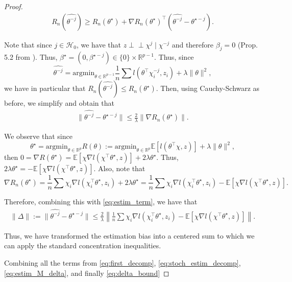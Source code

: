 \documentclass{article}
\theoremstyle{plain}
\theoremstyle{definition}
\theoremstyle{remark}
\newcommand{\indep}{\perp\!\!\!\perp}
\newcommand{\e}[1]{\mathbb{E}\left[#1\right]  } %
\begin{document}
\begin{proof}
\begin{align*}
    R_n(\widehat{\theta^{-j}})\geq R_n(\theta^\star)+\nabla R_n(\theta^\star)^\top (\widehat{\theta^{-j}}-\theta^{\star-j}).
\end{align*}

Note that since $j\in \mathcal{H}_0$, we have that $z\indep \chi^{j}\mid \chi^{-j}$ and therefore $\beta_j=0$ (Prop. 5.2 from \citet{reyerolobo2025principledapproachcomparingvariable}). Thus, $\beta^\star=(0,\beta^{\star -j})\in \{0\}\times \mathbb{R}^{p-1}$. Thus, since $$\widehat{\theta^{-j}}=\mathrm{argmin}_{\theta\in \mathbb{R}^{p-1}}\frac{1}{n}\sum l(\theta^\top \chi_i^{-j}, z_i)+\lambda\|\theta\|^2,$$
we have in particular that $R_n(\widehat{\theta^{-j}})\leq R_n(\theta^\star)$. Then, using Cauchy-Schwarz as before, we simplify and obtain that 
\begin{align}
    \|\widehat{\theta^{-j}}-\theta^{\star-j}\|\leq \frac{2}{\lambda}\|\nabla R_n(\theta^\star)\|. \label{eq:estim_term}
\end{align}

We observe that since $$\theta^\star=\mathrm{argmin}_{\theta\in \mathbb{R}^p}R(\theta):=\mathrm{argmin}_{\theta\in \mathbb{R}^p}\e{l(\theta^\top \chi, z)}+\lambda\|\theta\|^2,$$
then $0=\nabla R(\theta^\star)=\e{\chi\nabla l(\chi^\top \theta^\star, z)}+2\lambda\theta^\star$. Thus, $2\lambda\theta^\star=-\e{\chi\nabla l(\chi^\top \theta^\star, z)}.$ Also, note that $$\nabla R_n(\theta^\star)=\frac{1}{n}\sum \chi_i\nabla l (\chi_i^\top \theta^\star, z_i)+2\lambda\theta^\star=\frac{1}{n}\sum \chi_i\nabla l (\chi_i^\top \theta^\star, z_i)-\e{\chi\nabla l(\chi^\top \theta^\star, z)}.$$

Therefore, combining this with \eqref{eq:estim_term}, we have that 
\begin{align}\label{eq:delta_bound}
    \|\Delta\|:=\|\widehat{\theta^{-j}}-\theta^{\star-j}\|\leq \frac{2}{\lambda} \left\|\frac{1}{n}\sum \chi_i\nabla l (\chi_i^\top \theta^\star, z_i)-\e{\chi\nabla l(\chi^\top \theta^\star, z)}\right\|.
\end{align}

Thus, we have transformed the estimation bias into a centered sum to which we can apply the standard concentration inequalities. 


Combining all the terms from \eqref{eq:first_decomp}, \eqref{eq:stoch_estim_decomp}, \eqref{eq:estim_M_delta}, and finally \eqref{eq:delta_bound}


\end{proof}
\end{document}
